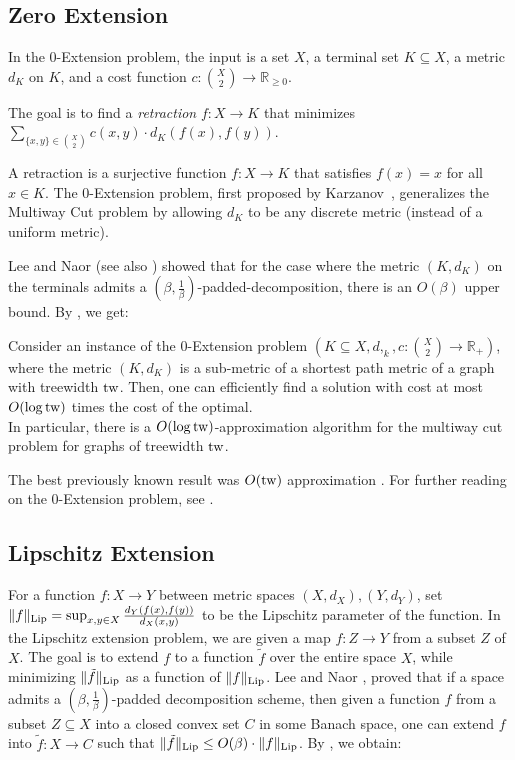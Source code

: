 \documentclass{theoretics}
\newcommand{\tw}{{\rm tw}}
\newcommand{\Lip}{{\rm Lip}}
\newcommand{\ProblemName}[1]{\textsf{#1}}
\newcommand{\ZEX}{\ProblemName{$0$-Extension}\xspace}
\begin{document}
\subsection{Zero Extension}

In the \ZEX problem, the input is a set $X$, a terminal set $K\subseteq X$, 
a metric $d_K$ on $K$, and a cost function 
$c\colon \binom{X}{2} \to \mathbb{R}_{\ge 0}$.

The goal is to find a \emph{retraction} $f:X\rightarrow K$ 
that minimizes $\sum_{\{x,y\}\in \binom{X}{2}} c(x,y)\cdot d_K(f(x),f(y))$.

A retraction is a surjective function $f:X\rightarrow K$ that satisfies $f(x)=x$ for all $x\in K$. The \ZEX problem, first proposed by Karzanov~\cite{Kar98}, 
generalizes the \ProblemName{Multiway Cut} problem \cite{DJPSY92} 
by allowing $d_K$ to be any discrete metric (instead of a uniform metric).

Lee and Naor \cite{LN05} (see also \cite{AFHKTT04,CKR04}) showed that for the case where the metric $(K,d_K)$ on the terminals admits a $(\beta,\frac1\beta)$-padded-decomposition, there is an $O(\beta)$ upper bound. By , we get:

\begin{corollary}\label{cor:0Extension}
	Consider an instance of the \ZEX problem $\left(K\subseteq X,d,_k,c:\binom{X}{2}\rightarrow \mathbb{R}_+\right)$, where the metric $(K,d_K)$ is a sub-metric of a shortest path metric of a graph with treewidth $\tw$. Then, one can efficiently find a solution with cost at most $O(\log\tw)$ times the cost of the optimal.\\
	In particular, there is a $O(\log \tw)$-approximation algorithm for the multiway cut problem for graphs of treewidth $\tw$.	
\end{corollary}
The best previously known result was $O(\tw)$ approximation \cite{CKR04,AGGNT19}. For further reading on the \ZEX problem, see \cite{CKR04,FHRT03,AFHKTT04,LN05,EGKRTT14,FKT19}.


\subsection{Lipschitz Extension}

For a function $f:X\rightarrow Y$ between metric spaces $(X,d_X),(Y,d_Y)$, set $\|f\|_{\Lip}=\sup_{x,y\in X}\frac{d_Y(f(x),f(y))}{d_X(x,y)}$ to be the Lipschitz parameter of the function. In the Lipschitz extension problem, we are given a map $f:Z\rightarrow Y$ from a subset $Z$ of $X$. The goal is to extend $f$ to a function $\tilde{f}$ over the entire space $X$, while minimizing $\|\tilde{f}\|_{\Lip}$ as a function of $\|f\|_{\Lip}$.
Lee and Naor \cite{LN05}, proved that if a space admits a $(\beta,\frac1\beta)$-padded decomposition scheme, then given a function $f$ from a subset $Z\subseteq X$ into a closed convex set $C$ in some Banach space, one can extend $f$ into $\tilde{f}:X\rightarrow C$
such that $\|\tilde{f}\|_{\Lip}\le O(\beta)\cdot \|f\|_{\Lip}$.
By , we obtain:
\end{document}
